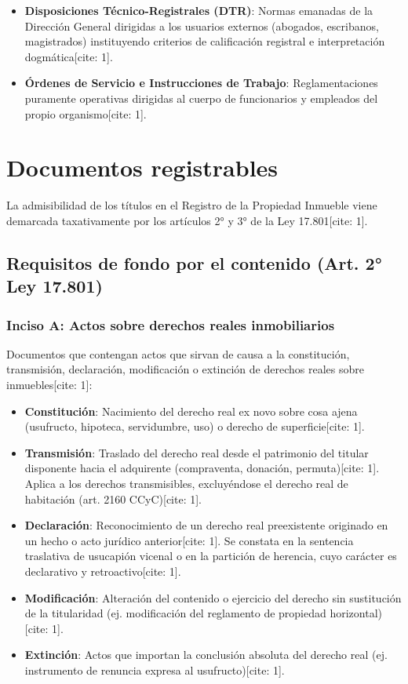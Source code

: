 \documentclass[12pt,oneside]{book}
\begin{document}
\begin{itemize}
    \item \textbf{Disposiciones Técnico-Registrales (DTR)}: Normas emanadas de la Dirección General dirigidas a los usuarios externos (abogados, escribanos, magistrados) instituyendo criterios de calificación registral e interpretación dogmática[cite: 1].
    \item \textbf{Órdenes de Servicio e Instrucciones de Trabajo}: Reglamentaciones puramente operativas dirigidas al cuerpo de funcionarios y empleados del propio organismo[cite: 1].
\end{itemize}

\section{Documentos registrables}

La admisibilidad de los títulos en el Registro de la Propiedad Inmueble viene demarcada taxativamente por los artículos 2° y 3° de la Ley 17.801[cite: 1].

\subsection{Requisitos de fondo por el contenido (Art. 2° Ley 17.801)}

\subsubsection{Inciso A: Actos sobre derechos reales inmobiliarios}
Documentos que contengan actos que sirvan de causa a la constitución, transmisión, declaración, modificación o extinción de derechos reales sobre inmuebles[cite: 1]:

\begin{itemize}
    \item \textbf{Constitución}: Nacimiento del derecho real ex novo sobre cosa ajena (usufructo, hipoteca, servidumbre, uso) o derecho de superficie[cite: 1].
    \item \textbf{Transmisión}: Traslado del derecho real desde el patrimonio del titular disponente hacia el adquirente (compraventa, donación, permuta)[cite: 1]. Aplica a los derechos transmisibles, excluyéndose el derecho real de habitación (art. 2160 CCyC)[cite: 1].
    \item \textbf{Declaración}: Reconocimiento de un derecho real preexistente originado en un hecho o acto jurídico anterior[cite: 1]. Se constata en la sentencia traslativa de usucapión vicenal o en la partición de herencia, cuyo carácter es declarativo y retroactivo[cite: 1].
    \item \textbf{Modificación}: Alteración del contenido o ejercicio del derecho sin sustitución de la titularidad (ej. modificación del reglamento de propiedad horizontal)[cite: 1].
    \item \textbf{Extinción}: Actos que importan la conclusión absoluta del derecho real (ej. instrumento de renuncia expresa al usufructo)[cite: 1].
\end{itemize}
\end{document}
